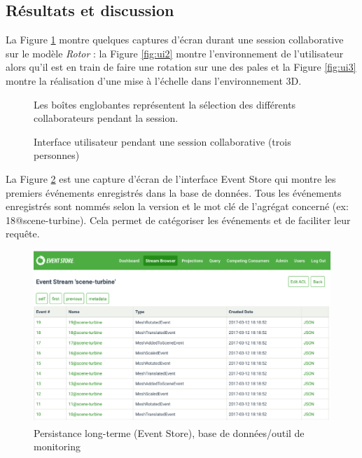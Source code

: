 \subsection{Résultats et discussion}
\label{sec:res}

La Figure \ref{fig:screenshots} montre quelques captures d'écran durant une 
session collaborative sur le modèle \textit{Rotor} :  la Figure \ref{fig:ui2} montre 
l'environnement de l'utilisateur alors qu'il est en train de faire une rotation sur une 
des pales et la Figure \ref{fig:ui3} montre la réalisation d'une mise à l'échelle dans 
l'environnement 3D.
\begin{figure}[ht!]
	\centering
	
	\hfill
	\hfill
	\caption{Interface utilisateur pendant une session collaborative (trois 
		personnes)}{Les boîtes englobantes représentent la sélection des différents 
		collaborateurs pendant la session.}
	\label{fig:screenshots}
\end{figure}

La Figure \ref{fig:ui4} est une capture d'écran de l'interface Event Store qui montre 
les premiers événements enregistrés dans la base de données. Tous les 
événements enregistrés sont nommés selon la version et le mot clé de l'agrégat 
concerné (ex: 18@scene-turbine). Cela permet de catégoriser les événements et 
de faciliter leur requête.

\begin{figure}[h!]
	\centering
	\includegraphics[width=\columnwidth]{eps/eventstore.eps}
	\caption{Persistance long-terme (Event Store\textsuperscript{\textregistered}), 
		base de données/outil de monitoring}
	\label{fig:ui4}
\end{figure}


